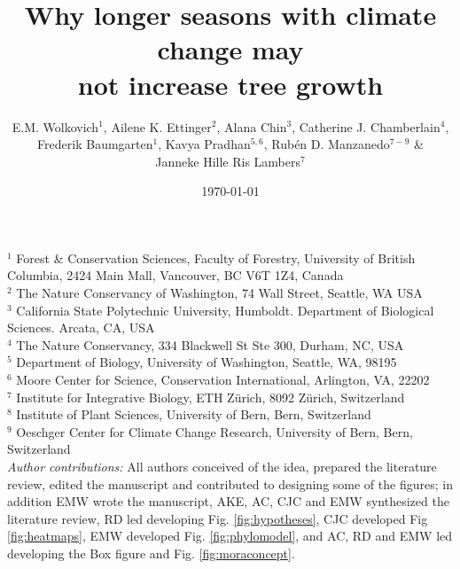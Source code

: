 \documentclass[11pt]{article}
\begin{document}
\renewcommand{\refname}{\CHead{}}


\title{Why longer seasons with climate change may \\ not increase tree growth} 
\author{E.M. Wolkovich$^1$, Ailene K. Ettinger$^2$, Alana Chin$^3$, Catherine J. Chamberlain$^4$,\\ Frederik Baumgarten$^1$, Kavya Pradhan$^{5,6}$, Rub{\'e}n D. Manzanedo$^{7-9}$ \& \\ Janneke Hille Ris Lambers$^7$}
\date{\today}
\maketitle

$^1$ Forest \& Conservation Sciences, Faculty of Forestry, University of British Columbia, 2424 Main Mall, Vancouver, BC V6T 1Z4, Canada\\
$^2$ The Nature Conservancy of Washington, 74 Wall Street, Seattle, WA  USA \\
$^3$ California State Polytechnic University, Humboldt. Department of Biological Sciences. Arcata, CA, USA \\
$^4$ The Nature Conservancy, 334 Blackwell St Ste 300, Durham, NC, USA \\ 
$^5$ Department of Biology, University of Washington, Seattle, WA, 98195 \\
$^6$ Moore Center for Science, Conservation International, Arlington, VA, 22202 \\ %
$^7$ Institute for Integrative Biology, ETH Z{\"u}rich, 8092 Z{\"u}rich, Switzerland \\ %
$^8$ Institute of Plant Sciences, University of Bern, Bern, Switzerland \\
$^9$ Oeschger Center for Climate Change Research, University of Bern, Bern, Switzerland \\

\emph{Author contributions:}  All authors conceived of the idea, prepared the literature review, edited the manuscript and contributed to designing some of the figures; in addition EMW wrote the manuscript, AKE, AC, CJC  and EMW synthesized the literature review, RD led developing Fig. \ref{fig:hypotheses}, CJC developed Fig \ref{fig:heatmaps}, EMW developed Fig. \ref{fig:phylomodel}, and AC, RD and EMW led developing the Box figure and Fig. \ref{fig:moraconcept}. 
\end{document}
